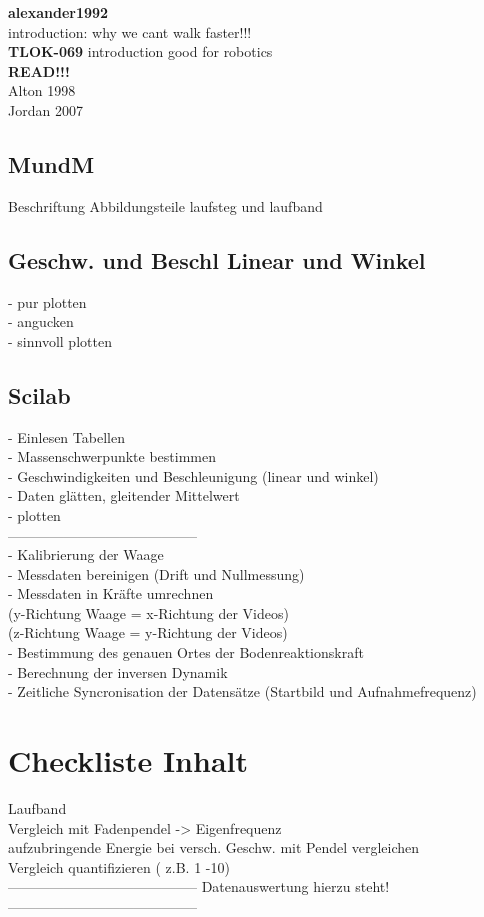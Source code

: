 \textbf{alexander1992}\\
introduction: why we cant walk faster!!!\\

\textbf{TLOK-069}
introduction good for robotics\\


\textbf{READ!!!}\\
Alton 1998\\
Jordan 2007\\


\subsection{MundM}
Beschriftung Abbildungsteile laufsteg und laufband
\subsection{Geschw. und Beschl Linear und Winkel}
- pur plotten\\
- angucken\\
- sinnvoll plotten\\
\subsection{Scilab}
- Einlesen Tabellen\\
- Massenschwerpunkte bestimmen\\
- Geschwindigkeiten und Beschleunigung (linear und winkel)\\
- Daten glätten, gleitender Mittelwert\\
- plotten\\
-----------------------------------------\\
- Kalibrierung der Waage\\
- Messdaten bereinigen (Drift und Nullmessung)\\
- Messdaten in Kräfte umrechnen\\
(y-Richtung Waage = x-Richtung der Videos)\\
(z-Richtung Waage = y-Richtung der Videos)\\
- Bestimmung des genauen Ortes der Bodenreaktionskraft\\
- Berechnung der inversen Dynamik\\
- Zeitliche Syncronisation der Datensätze (Startbild und Aufnahmefrequenz)\\
\clearpage

\section{Checkliste Inhalt}
Laufband\\
Vergleich mit Fadenpendel -> Eigenfrequenz\\
aufzubringende Energie bei versch. Geschw. mit Pendel vergleichen\\
Vergleich quantifizieren ( z.B. 1 -10)\\
-----------------------------------------
Datenauswertung hierzu steht!
-----------------------------------------\\\\

